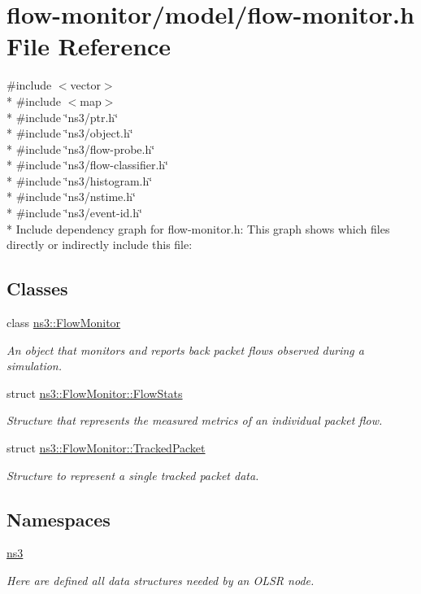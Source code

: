 \hypertarget{flow-monitor_8h}{}\section{flow-\/monitor/model/flow-\/monitor.h File Reference}
\label{flow-monitor_8h}
{\ttfamily \#include $<$vector$>$}\\*
{\ttfamily \#include $<$map$>$}\\*
{\ttfamily \#include \char`\"{}ns3/ptr.\+h\char`\"{}}\\*
{\ttfamily \#include \char`\"{}ns3/object.\+h\char`\"{}}\\*
{\ttfamily \#include \char`\"{}ns3/flow-\/probe.\+h\char`\"{}}\\*
{\ttfamily \#include \char`\"{}ns3/flow-\/classifier.\+h\char`\"{}}\\*
{\ttfamily \#include \char`\"{}ns3/histogram.\+h\char`\"{}}\\*
{\ttfamily \#include \char`\"{}ns3/nstime.\+h\char`\"{}}\\*
{\ttfamily \#include \char`\"{}ns3/event-\/id.\+h\char`\"{}}\\*
Include dependency graph for flow-\/monitor.h\+:
This graph shows which files directly or indirectly include this file\+:
\subsection*{Classes}
\begin{DoxyCompactItemize}
\item 
class \hyperlink{classns3_1_1FlowMonitor}{ns3\+::\+Flow\+Monitor}
\begin{DoxyCompactList}\small\item\em An object that monitors and reports back packet flows observed during a simulation. \end{DoxyCompactList}\item 
struct \hyperlink{structns3_1_1FlowMonitor_1_1FlowStats}{ns3\+::\+Flow\+Monitor\+::\+Flow\+Stats}
\begin{DoxyCompactList}\small\item\em Structure that represents the measured metrics of an individual packet flow. \end{DoxyCompactList}\item 
struct \hyperlink{structns3_1_1FlowMonitor_1_1TrackedPacket}{ns3\+::\+Flow\+Monitor\+::\+Tracked\+Packet}
\begin{DoxyCompactList}\small\item\em Structure to represent a single tracked packet data. \end{DoxyCompactList}\end{DoxyCompactItemize}
\subsection*{Namespaces}
\begin{DoxyCompactItemize}
\item 
 \hyperlink{namespacens3}{ns3}
\begin{DoxyCompactList}\small\item\em Here are defined all data structures needed by an O\+L\+SR node. \end{DoxyCompactList}\end{DoxyCompactItemize}
